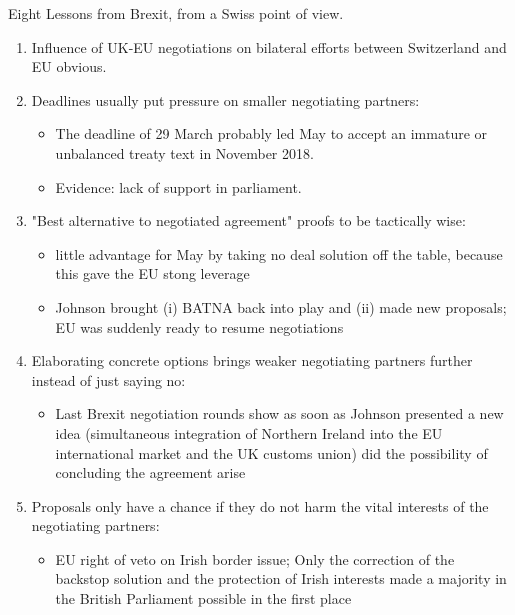 Eight Lessons from Brexit, from a Swiss point of view.

\begin{enumerate}[1)]
    \item Influence of UK-EU negotiations on bilateral efforts between Switzerland
        and EU obvious.
    \item Deadlines usually put pressure on smaller negotiating partners:
        \begin{itemize}
            \item The deadline of 29 March probably led May to accept an immature
                or unbalanced treaty text in November 2018.
            \item Evidence: lack of support in parliament.
        \end{itemize}
    \item "Best alternative to negotiated agreement" proofs to be tactically wise:
        \begin{itemize}
            \item little advantage for May by taking no deal solution off the
                table, because this gave the EU stong leverage
            \item Johnson brought (i) BATNA back into play and (ii) made new
                proposals; EU was suddenly ready to resume negotiations
        \end{itemize}
    \item Elaborating concrete options brings weaker negotiating partners further
        instead of just saying no:
        \begin{itemize}
            \item Last Brexit negotiation rounds show as soon as Johnson presented
                a new idea (simultaneous integration of Northern Ireland into the
                EU international market and the UK customs union) did the possibility
                of concluding the agreement arise
        \end{itemize}
    \item Proposals only have a chance if they do not harm the vital interests
        of the negotiating partners:
        \begin{itemize}
            \item EU right of veto on Irish border issue;
            Only the correction of the backstop solution and the protection
            of Irish interests made a majority in the British Parliament possible
            in the first place
        \end{itemize}

\end{enumerate}

